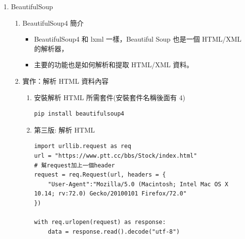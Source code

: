 \documentclass[a4paper,12pt]{article}
\begin{document}
\begin{enumerate}
\begin{enumerate}
\begin{enumerate}
\begin{enumerate}
\begin{results}
<div id=``main-container''>\\
	<div id=``action-bar-container''>\\
		<div class=``action-bar''>\\
			<div class=``btn-group bt\\
\end{results}
\end{enumerate}
\end{enumerate}
\end{enumerate}


\item BeautifulSoup
\label{sec:org544d197}
\begin{enumerate}
\item BeautifulSoup4 簡介
\label{sec:orgc9ab92d}
\begin{itemize}
\item BeautifulSoup4 和 lxml 一樣，Beautiful Soup 也是一個 HTML/XML 的解析器，\\
\item 主要的功能也是如何解析和提取 HTML/XML 資料。\\
\end{itemize}
\item 實作：解析 HTML 資料內容
\label{sec:org7e33db7}
\begin{enumerate}
\item 安裝解析 HTML 所需套件(安裝套件名稱後面有 4)
\label{sec:orga7ac7a0}
\lstset{breaklines=true,language=shell,label= ,caption= ,captionpos=b,numbers=none}
\begin{lstlisting}
pip install beautifulsoup4
\end{lstlisting}
\item 第三版: 解析 HTML
\label{sec:org37c9a21}
\lstset{breaklines=true,language=Python,label= ,caption= ,captionpos=b,firstnumber=1,numbers=left}
\begin{lstlisting}
import urllib.request as req
url = "https://www.ptt.cc/bbs/Stock/index.html"
# 幫request加上一個header
request = req.Request(url, headers = {
    "User-Agent":"Mozilla/5.0 (Macintosh; Intel Mac OS X 10.14; rv:72.0) Gecko/20100101 Firefox/72.0"
})

with req.urlopen(request) as response:
    data = response.read().decode("utf-8")


\end{lstlisting}
\end{enumerate}
\end{enumerate}
\end{enumerate}
\end{document}
